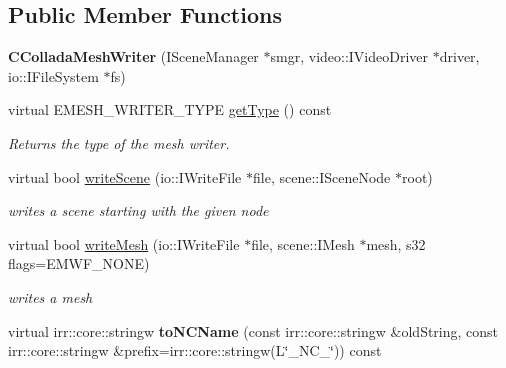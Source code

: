 \subsection*{Public Member Functions}
\begin{DoxyCompactItemize}
\item 
\hypertarget{classirr_1_1scene_1_1_c_collada_mesh_writer_ab22f3834f4aef11b6c9e63bfe197e551}{{\bfseries C\-Collada\-Mesh\-Writer} (I\-Scene\-Manager $\ast$smgr, video\-::\-I\-Video\-Driver $\ast$driver, io\-::\-I\-File\-System $\ast$fs)}\label{classirr_1_1scene_1_1_c_collada_mesh_writer_ab22f3834f4aef11b6c9e63bfe197e551}

\item 
\hypertarget{classirr_1_1scene_1_1_c_collada_mesh_writer_afd5a767814689033034e039a1b211f9f}{virtual E\-M\-E\-S\-H\-\_\-\-W\-R\-I\-T\-E\-R\-\_\-\-T\-Y\-P\-E \hyperlink{classirr_1_1scene_1_1_c_collada_mesh_writer_afd5a767814689033034e039a1b211f9f}{get\-Type} () const }\label{classirr_1_1scene_1_1_c_collada_mesh_writer_afd5a767814689033034e039a1b211f9f}

\begin{DoxyCompactList}\small\item\em Returns the type of the mesh writer. \end{DoxyCompactList}\item 
\hypertarget{classirr_1_1scene_1_1_c_collada_mesh_writer_a918d41fd53f0510d05805cb1166e727a}{virtual bool \hyperlink{classirr_1_1scene_1_1_c_collada_mesh_writer_a918d41fd53f0510d05805cb1166e727a}{write\-Scene} (io\-::\-I\-Write\-File $\ast$file, scene\-::\-I\-Scene\-Node $\ast$root)}\label{classirr_1_1scene_1_1_c_collada_mesh_writer_a918d41fd53f0510d05805cb1166e727a}

\begin{DoxyCompactList}\small\item\em writes a scene starting with the given node \end{DoxyCompactList}\item 
\hypertarget{classirr_1_1scene_1_1_c_collada_mesh_writer_aa40bbd87da58b9a55ac92378f6d3d319}{virtual bool \hyperlink{classirr_1_1scene_1_1_c_collada_mesh_writer_aa40bbd87da58b9a55ac92378f6d3d319}{write\-Mesh} (io\-::\-I\-Write\-File $\ast$file, scene\-::\-I\-Mesh $\ast$mesh, s32 flags=E\-M\-W\-F\-\_\-\-N\-O\-N\-E)}\label{classirr_1_1scene_1_1_c_collada_mesh_writer_aa40bbd87da58b9a55ac92378f6d3d319}

\begin{DoxyCompactList}\small\item\em writes a mesh \end{DoxyCompactList}\item 
\hypertarget{classirr_1_1scene_1_1_c_collada_mesh_writer_ae21e29ddd284633045f96b08c1a215df}{virtual irr\-::core\-::stringw {\bfseries to\-N\-C\-Name} (const irr\-::core\-::stringw \&old\-String, const irr\-::core\-::stringw \&prefix=irr\-::core\-::stringw(L\char`\"{}\-\_\-\-N\-C\-\_\-\char`\"{})) const }\label{classirr_1_1scene_1_1_c_collada_mesh_writer_ae21e29ddd284633045f96b08c1a215df}

\end{DoxyCompactItemize}
